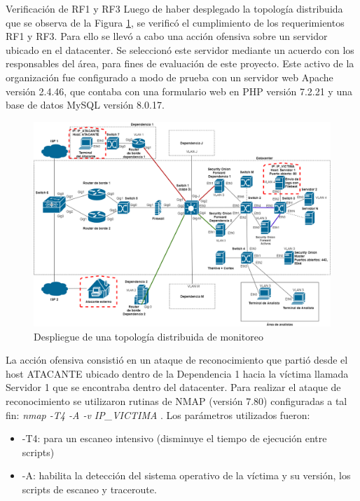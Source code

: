     \begin{section}{Verificación de RF1 y RF3}
    Luego de haber desplegado la topología distribuida que se observa de la Figura \ref{fig:iter1_ver_RF1_RF2}, se verificó el cumplimiento de los requerimientos RF1 y RF3. Para ello se llevó a cabo una acción ofensiva sobre un servidor ubicado en el datacenter. Se seleccionó este servidor mediante un acuerdo con los responsables del área, para fines de evaluación de este proyecto. Este activo de la organización fue configurado a modo de prueba con un servidor web Apache versión 2.4.46, que contaba con una formulario web en PHP versión  7.2.21  y una base de datos MySQL versión 8.0.17.\par
    \begin{figure}[H]
    \centering
    \includegraphics[width=1\textwidth]{./iteracion_1_imagenes/Topologia de despliegue descentralizada RF2, RF6 y RF4.png}
    \caption{Despliegue de una topología distribuida de monitoreo}
    \label{fig:iter1_ver_RF1_RF2}
    \end{figure}
    La acción ofensiva consistió en un ataque de reconocimiento que partió desde el host ATACANTE ubicado dentro de la Dependencia 1 hacia la víctima llamada Servidor 1 que se encontraba dentro del datacenter.
    Para realizar el ataque de reconocimiento se utilizaron rutinas de NMAP \cite{nmap} (versión 7.80) configuradas a tal fin: \textit{nmap -T4 -A -v IP\_VICTIMA} . Los parámetros utilizados fueron:
    \begin{itemize}
    \item -T4: para un escaneo intensivo (disminuye el tiempo de ejecución entre scripts)
    \item -A: habilita la detección del sistema operativo de la víctima y su versión, los scripts de escaneo y traceroute.

\end{itemize}
\end{section}
